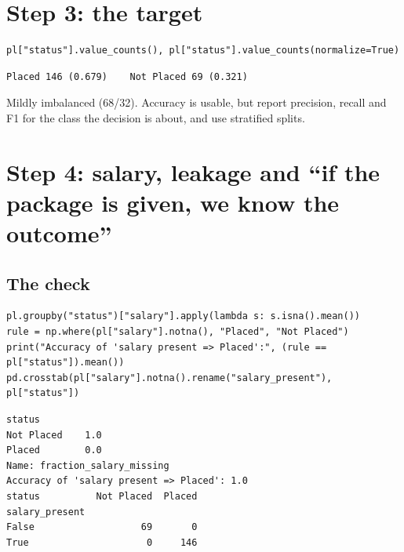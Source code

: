 \section{Step 3: the target}
\begin{lstlisting}
pl["status"].value_counts(), pl["status"].value_counts(normalize=True)
\end{lstlisting}
\outlabel
\begin{lstlisting}[style=out]
Placed 146 (0.679)    Not Placed 69 (0.321)
\end{lstlisting}
Mildly imbalanced (68/32). Accuracy is usable, but report precision, recall and F1 for the class the decision is about, and use stratified splits.

\section{Step 4: salary, leakage and ``if the package is given, we know the outcome''}
\subsection{The check}
\begin{lstlisting}
pl.groupby("status")["salary"].apply(lambda s: s.isna().mean())
rule = np.where(pl["salary"].notna(), "Placed", "Not Placed")
print("Accuracy of 'salary present => Placed':", (rule == pl["status"]).mean())
pd.crosstab(pl["salary"].notna().rename("salary_present"), pl["status"])
\end{lstlisting}
\outlabel
\begin{lstlisting}[style=out]
status
Not Placed    1.0
Placed        0.0
Name: fraction_salary_missing
Accuracy of 'salary present => Placed': 1.0
status          Not Placed  Placed
salary_present
False                   69       0
True                     0     146
\end{lstlisting}

